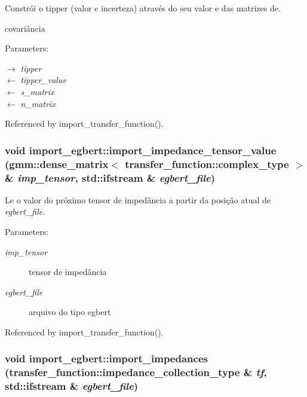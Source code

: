 Constrói o tipper (valor e incerteza) através do seu valor e das matrizes de. 

covariância

\begin{Desc}
\item[Parameters:]
\begin{description}
\item[\mbox{$\rightarrow$} {\em tipper}]\item[\mbox{$\leftarrow$} {\em tipper\_\-value}]\item[\mbox{$\leftarrow$} {\em s\_\-matrix}]\item[\mbox{$\leftarrow$} {\em n\_\-matrix}]\end{description}
\end{Desc}


Referenced by import\_\-transfer\_\-function().
\subsubsection{\setlength{\rightskip}{0pt plus 5cm}void import\_\-egbert::import\_\-impedance\_\-tensor\_\-value (gmm::dense\_\-matrix$<$ transfer\_\-function::complex\_\-type $>$ \& {\em imp\_\-tensor}, \/  std::ifstream \& {\em egbert\_\-file})}\label{namespaceimport__egbert_cb58badd0f37a513aa39531fda3a10c3}


Le o valor do próximo tensor de impedância a partir da posição atual de {\em egbert\_\-file\/}. 

\begin{Desc}
\item[Parameters:]
\begin{description}
\item[{\em imp\_\-tensor}]tensor de impedância \item[{\em egbert\_\-file}]arquivo do tipo egbert \end{description}
\end{Desc}


Referenced by import\_\-transfer\_\-function().
\subsubsection{\setlength{\rightskip}{0pt plus 5cm}void import\_\-egbert::import\_\-impedances ({\bf transfer\_\-function::impedance\_\-collection\_\-type} \& {\em tf}, \/  std::ifstream \& {\em egbert\_\-file})}\label{namespaceimport__egbert_8f237396b6cd6422ed975c67385b7b82}


